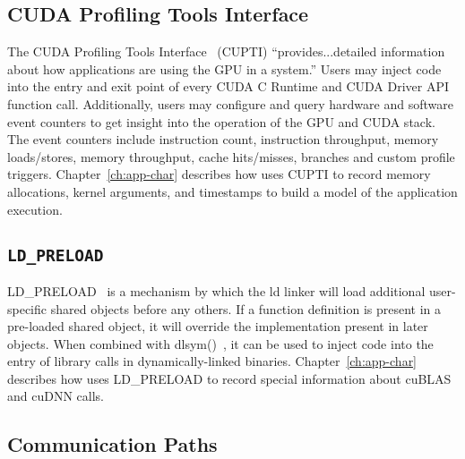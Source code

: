 \subsection{CUDA Profiling Tools Interface}
\label{sec:cupti}

The CUDA Profiling Tools Interface~\cite{nvidia2017cupti} (CUPTI) ``provides...detailed information about how applications are using the GPU in a system.''
Users may inject code into the entry and exit point of every CUDA C Runtime and CUDA Driver API function call.
Additionally, users may configure and query hardware and software event counters to get insight into the operation of the GPU and CUDA stack.
The event counters include instruction count, instruction throughput, memory loads/stores, memory throughput, cache hits/misses, branches and custom profile triggers.
Chapter~\ref{ch:app-char} describes how  uses CUPTI to record memory allocations, kernel arguments, and timestamps to build a model of the application execution.

\subsection{\texttt{LD\_PRELOAD}}
\label{sec:ldpreload}

LD\_PRELOAD~\cite{kerrisk2017ld} is a mechanism by which the ld linker will load additional user-specific shared objects before any others.
If a function definition is present in a pre-loaded shared object, it will override the implementation present in later objects.
When combined with dlsym()~\cite{kerrisk2017dlysm}, it can be used to inject code into the entry of library calls in dynamically-linked binaries.
Chapter~\ref{ch:app-char} describes how  uses LD\_PRELOAD to record special information about cuBLAS and cuDNN calls.

\cite{kerrisk2017ld}

\subsection{ Communication Paths}

